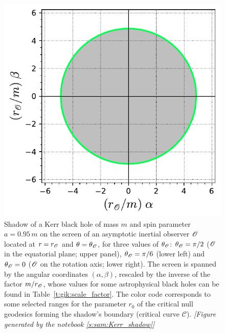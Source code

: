 \begin{figure}
\begin{center}
\includegraphics[height=0.28\textheight]{gik_shadow_a95_th00.pdf}
\end{center}
\caption[]{\label{f:gik:shadow_a95} \footnotesize
Shadow of a Kerr black hole of mass $m$ and spin parameter $a=0.95\, m$ on the screen of an asymptotic
inertial observer $\mathscr{O}$ located at $r=r_{\mathscr{O}}$ and $\theta=\theta_{\mathscr{O}}$, for three
values of $\theta_{\mathscr{O}}$: $\theta_{\mathscr{O}} = \pi/2$ ($\mathscr{O}$ in the equatorial plane; upper panel),
$\theta_{\mathscr{O}} = \pi/6$ (lower left) and $\theta_{\mathscr{O}} = 0$ ($\mathscr{O}$ on the rotation axis; lower right).
The screen is spanned by the angular coordinates $(\alpha,\beta)$, rescaled by the inverse of
the factor $m/r_{\mathscr{O}}$, whose values for some astrophysical black holes can be found in Table~\ref{t:gik:scale_factor}.
The color code corresponds to some selected ranges for the parameter $r_0$
of the critical null geodesics forming the shadow's boundary (critical curve $\mathscr{C}$).
\textsl{[Figure generated by the notebook \ref{s:sam:Kerr_shadow}]}
}
\end{figure}

